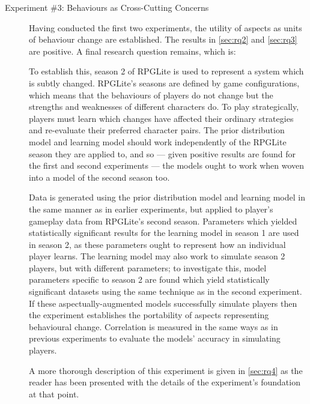 \begin{description}
\item[Experiment \#3: Behaviours as Cross-Cutting Concerns] Having conducted the
first two experiments, the utility of aspects as units of behaviour change are
established. The results in \cref{sec:rq2} and \cref{sec:rq3} are positive. A
final research question remains, which is: \emph{\rqfour{}}

To establish this, season 2 of RPGLite is used to represent a system
which is subtly changed. RPGLite's seasons are defined by game configurations,
which means that the behaviours of players do not change but the strengths and
weaknesses of different characters do. To play strategically, players must learn
which changes have affected their ordinary strategies and re-evaluate their
preferred character pairs. The prior distribution model and learning model
should work independently of the RPGLite season they are applied to, and so ---
given positive results are found for the first and second experiments --- the
models ought to work when woven into a model of the second season
too.

Data is generated using the prior distribution model and learning model in the
same manner as in earlier experiments, but applied to player's gameplay data
from RPGLite's second season. Parameters which yielded statistically significant
results for the learning model in season 1 are used in season 2, as these
parameters ought to represent how an individual player learns. The learning
model may also work to simulate season 2 players, but with different parameters;
to investigate this, model parameters specific to season 2 are found which yield
statistically significant datasets using the same technique as in the second
experiment. If these aspectually-augmented models successfully simulate players
then the experiment establishes the portability of aspects representing
behavioural change. Correlation is measured in the same ways as in previous
experiments to evaluate the models' accuracy in simulating players.

A more thorough description of this experiment is given in \cref{sec:rq4} as the
reader has been presented with the details of the experiment's foundation at
that point.


\end{description}




